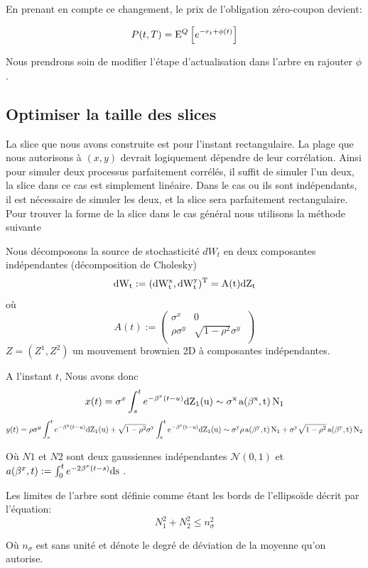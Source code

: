 En prenant en compte ce changement, le prix de l'obligation zéro-coupon devient:

$$P(t, T) = \mathrm{E}^Q \left[  e^{-r_t + \phi(t)} \right]$$

Nous prendrons soin de modifier l'étape d'actualisation dans l'arbre en rajouter $\phi$.

\subsection{Optimiser la taille des slices }

La slice que nous avons construite est pour l'instant rectangulaire.
La plage que nous autorisons à $(x, y)$ devrait logiquement dépendre de leur corrélation. Ainsi pour simuler deux processus parfaitement corrélés, il suffit de simuler l'un deux, la slice dans ce cas est simplement linéaire. Dans le cas ou ils sont indépendants, il est nécessaire de simuler les deux, et la slice sera parfaitement rectangulaire. Pour trouver la forme de la slice dans le cas général nous utilisons la méthode suivante 

Nous décomposons la source de stochasticité $dW_t$ en deux composantes indépendantes (décomposition de Cholesky)
$$ \rm{d} W_t := (\rm{d} W^x_t, \rm{d} W^y_t)^T = A(t)  \rm{d}Z_t$$
où
$$
A(t) := 
\left(
  \begin{array}{cc}
            \sigma^x & 0  \\
            \rho \sigma^y & \sqrt{1-\rho^2} \sigma^y \  \\
  \end{array}
\right)
$$
$Z = (Z^1, Z^2)$ un mouvement brownien 2D à composantes indépendantes.

A l'instant $t$, Nous avons donc
$$x(t) =  \sigma^x \int_s^t e^{- \beta^x (t-u)} \rm{d} Z_1(u) \sim \sigma^x \,a(\beta^x, t) \,N_1$$
$$y(t) =  \rho \sigma^y \int_s^t e^{- \beta^y (t-u)} \rm{d} Z_1(u)+ \sqrt{1-\rho^2} \sigma^y \int_s^t e^{- \beta^y (t-u)} \rm{d} Z_1(u) \sim \sigma^y \rho \, a(\beta^y, t) \, N_1 + \sigma^y \sqrt{1-\rho^2}  \, a(\beta^y, t)\, N_2$$

Où $N1$ et $N2$ sont deux gaussiennes indépendantes $\mathcal{N}(0, 1)$ et $a(\beta^x,t) := \int_0^t e^{-2 \beta^x (t-s)} \rm{d}s$ .

Les limites de l'arbre sont définie comme étant les bords de l'ellipsoïde décrit par l'équation:
$$N_1^2 + N_2^2 \leq n_{\sigma}^2$$

Où $n_{\sigma}$ est sans unité et dénote le degré de déviation de la moyenne qu'on autorise.


